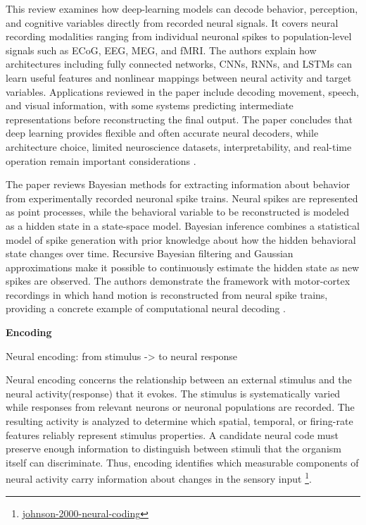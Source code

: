 \documentclass{book}
\providecommand{\ProjectDeepHeading}[2]{%
    \par\medskip\noindent\textbf{#2}\par\smallskip
}
\providecommand{\seeherefooter}[1]{\footnote{\url{#1}}}
\begin{document}
        This review examines how deep-learning models can decode behavior, perception, and cognitive variables directly from recorded neural signals. It covers neural recording modalities ranging from individual neuronal spikes to population-level signals such as ECoG, EEG, MEG, and fMRI. The authors explain how architectures including fully connected networks, CNNs, RNNs, and LSTMs can learn useful features and nonlinear mappings between neural activity and target variables. Applications reviewed in the paper include decoding movement, speech, and visual information, with some systems predicting intermediate representations before reconstructing the final output. The paper concludes that deep learning provides flexible and often accurate neural decoders, while architecture choice, limited neuroscience datasets, interpretability, and real-time operation remain important considerations \cite{livezey-2021-deep-learning-approaches-for-neural-decoding-across-architectures-and-recording-modalities}.
        
        The paper reviews Bayesian methods for extracting information about behavior from experimentally recorded neuronal spike trains. Neural spikes are represented as point processes, while the behavioral variable to be reconstructed is modeled as a hidden state in a state-space model. Bayesian inference combines a statistical model of spike generation with prior knowledge about how the hidden behavioral state changes over time. Recursive Bayesian filtering and Gaussian approximations make it possible to continuously estimate the hidden state as new spikes are observed. The authors demonstrate the framework with motor-cortex recordings in which hand motion is reconstructed from neural spike trains, providing a concrete example of computational neural decoding \cite{koyama-2010-bayesian-decoding-of-neural-spike-trains}.

\ProjectDeepHeading{8}{Encoding}


Neural encoding: from stimulus -> to neural response
    
    Neural encoding concerns the relationship between an external stimulus and the neural activity(response) that it evokes. The stimulus is systematically varied while responses from relevant neurons or neuronal populations are recorded. The resulting activity is analyzed to determine which spatial, temporal, or firing-rate features reliably represent stimulus properties. A candidate neural code must preserve enough information to distinguish between stimuli that the organism itself can discriminate. Thus, encoding identifies which measurable components of neural activity carry information about changes in the sensory input \seeherefooter{johnson-2000-neural-coding}.
\end{document}
